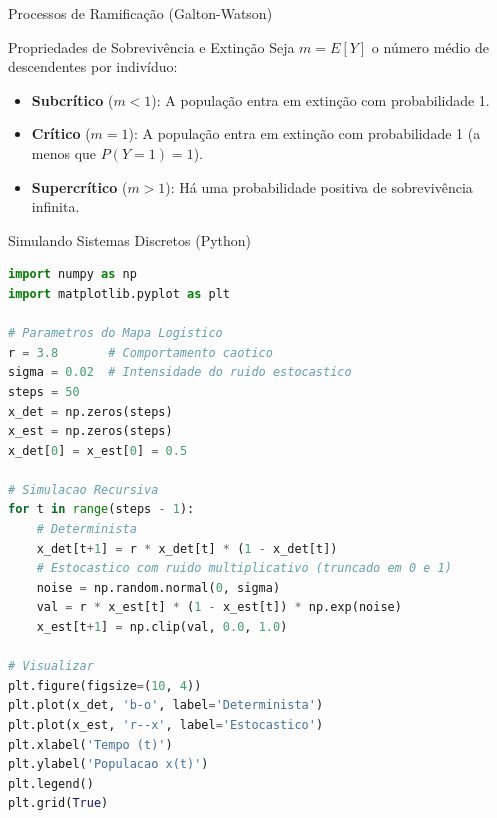 \begin{frame}[allowframebreaks]{Processos de Ramificação (Galton-Watson)}

\begin{block}{Propriedades de Sobrevivência e Extinção}
Seja $m = E[Y]$ o número médio de descendentes por indivíduo:
\begin{itemize}
    \item \textbf{Subcrítico} ($m < 1$): A população entra em extinção com probabilidade 1.
    \item \textbf{Crítico} ($m = 1$): A população entra em extinção com probabilidade 1 (a menos que $P(Y=1)=1$).
    \item \textbf{Supercrítico} ($m > 1$): Há uma probabilidade positiva de sobrevivência infinita.
\end{itemize}
\end{block}
\end{frame}

\begin{frame}{Simulando Sistemas Discretos (Python)}
\begin{lstlisting}[language=Python, basicstyle=\ttfamily\footnotesize]
import numpy as np
import matplotlib.pyplot as plt

# Parametros do Mapa Logistico
r = 3.8       # Comportamento caotico
sigma = 0.02  # Intensidade do ruido estocastico
steps = 50
x_det = np.zeros(steps)
x_est = np.zeros(steps)
x_det[0] = x_est[0] = 0.5

# Simulacao Recursiva
for t in range(steps - 1):
    # Determinista
    x_det[t+1] = r * x_det[t] * (1 - x_det[t])
    # Estocastico com ruido multiplicativo (truncado em 0 e 1)
    noise = np.random.normal(0, sigma)
    val = r * x_est[t] * (1 - x_est[t]) * np.exp(noise)
    x_est[t+1] = np.clip(val, 0.0, 1.0)

# Visualizar
plt.figure(figsize=(10, 4))
plt.plot(x_det, 'b-o', label='Determinista')
plt.plot(x_est, 'r--x', label='Estocastico')
plt.xlabel('Tempo (t)')
plt.ylabel('Populacao x(t)')
plt.legend()
plt.grid(True)
\end{lstlisting}
\end{frame}

